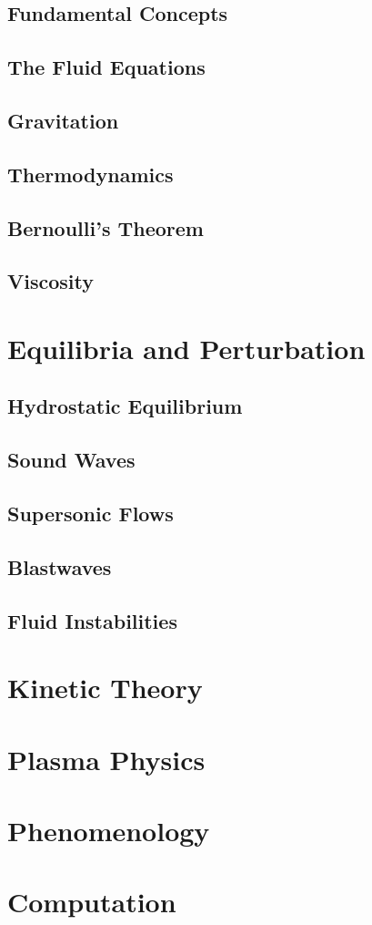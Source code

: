 \documentclass[11pt,fleqn]{book} %
\begin{document}
\chapter{Fundamental Concepts}
\label{ch:1}

\chapter{The Fluid Equations}

\chapter{Gravitation}

\chapter{Thermodynamics}

\chapter{Bernoulli's Theorem}

\chapter{Viscosity}


\part{Equilibria and Perturbation}

\chapter{Hydrostatic Equilibrium}

\chapter{Sound Waves}

\chapter{Supersonic Flows}

\chapter{Blastwaves}

\chapter{Fluid Instabilities}


\part{Kinetic Theory}

\part{Plasma Physics}

\part{Phenomenology}

\part{Computation}
\end{document}
